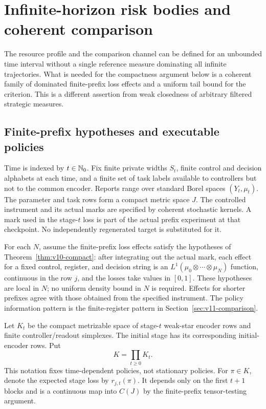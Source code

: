 \section{Infinite-horizon risk bodies and coherent comparison}
\label{sec:v12-infinite}

The resource profile and the comparison channel can be defined for an
unbounded time interval without a single reference measure dominating
all infinite trajectories. What is needed for the compactness argument
below is a coherent family of dominated finite-prefix loss effects and a
uniform tail bound for the criterion. This is a different assertion from
weak closedness of arbitrary filtered strategic measures.

\subsection{Finite-prefix hypotheses and executable policies}
Time is indexed by $t\in\mathbb N_0$. Fix finite private widths $S_t$, finite
control and decision alphabets at each time, and a finite set of task
labels available to controllers but not to the common encoder. Reports
range over standard Borel spaces $(Y_t,\mu_t)$. The parameter and task rows
form a compact metric space $J$. The controlled instrument and its actual
marks are specified by coherent stochastic kernels. A mark used in the
stage-$t$ loss is part of the actual prefix experiment at that checkpoint.
No independently regenerated target is substituted for it.

For each $N$, assume the finite-prefix loss effects satisfy the hypotheses
of Theorem~\ref{thm:v10-compact}: after integrating out the actual mark,
each effect for a fixed control, register, and decision string is an
$L^1(\mu_0\otimes\cdots\otimes\mu_N)$ function, continuous in the row
$j$, and the losses take values in $[0,1]$. These hypotheses are local in
$N$; no uniform density bound in $N$ is required. Effects for shorter
prefixes agree with those obtained from the specified instrument. The
policy information pattern is the finite-register pattern in
Section~\ref{sec:v11-comparison}.

Let $K_t$ be the compact metrizable space of stage-$t$ weak-star encoder
rows and finite controller/readout simplexes. The initial stage has its
corresponding initial-encoder rows. Put
\[
 K=\prod_{t\ge0}K_t.
\]
This notation fixes time-dependent policies, not stationary policies.
For $\pi\in K$, denote the expected stage loss by $r_{j,t}(\pi)$. It
depends only on the first $t+1$ blocks and is a continuous map into
$C(J)$ by the finite-prefix tensor-testing argument.

